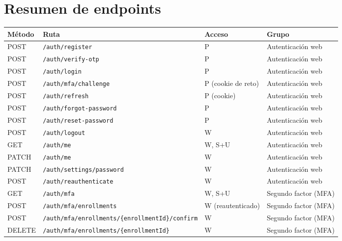 \documentclass[11pt,a4paper]{report}
\begin{document}
\section{Resumen de endpoints}
\begin{center}\small
\begin{longtable}{@{}lp{7.3cm}p{2.8cm}p{3.4cm}@{}}
\toprule
Método & Ruta & Acceso & Grupo \\
\midrule
\endhead
POST & \texttt{/\allowbreak{}auth/\allowbreak{}register} & P & Autenticación web\\
POST & \texttt{/\allowbreak{}auth/\allowbreak{}verify-otp} & P & Autenticación web\\
POST & \texttt{/\allowbreak{}auth/\allowbreak{}login} & P & Autenticación web\\
POST & \texttt{/\allowbreak{}auth/\allowbreak{}mfa/\allowbreak{}challenge} & P (cookie de reto) & Autenticación web\\
POST & \texttt{/\allowbreak{}auth/\allowbreak{}refresh} & P (cookie) & Autenticación web\\
POST & \texttt{/\allowbreak{}auth/\allowbreak{}forgot-password} & P & Autenticación web\\
POST & \texttt{/\allowbreak{}auth/\allowbreak{}reset-password} & P & Autenticación web\\
POST & \texttt{/\allowbreak{}auth/\allowbreak{}logout} & W & Autenticación web\\
GET & \texttt{/\allowbreak{}auth/\allowbreak{}me} & W, S+U & Autenticación web\\
PATCH & \texttt{/\allowbreak{}auth/\allowbreak{}me} & W & Autenticación web\\
PATCH & \texttt{/\allowbreak{}auth/\allowbreak{}settings/\allowbreak{}password} & W & Autenticación web\\
POST & \texttt{/\allowbreak{}auth/\allowbreak{}reauthenticate} & W & Autenticación web\\
GET & \texttt{/\allowbreak{}auth/\allowbreak{}mfa} & W, S+U & Segundo factor (MFA)\\
POST & \texttt{/\allowbreak{}auth/\allowbreak{}mfa/\allowbreak{}enrollments} & W (reautenticado) & Segundo factor (MFA)\\
POST & \texttt{/\allowbreak{}auth/\allowbreak{}mfa/\allowbreak{}enrollments/\allowbreak{}\{enrollmentId\}/\allowbreak{}confirm} & W & Segundo factor (MFA)\\
DELETE & \texttt{/\allowbreak{}auth/\allowbreak{}mfa/\allowbreak{}enrollments/\allowbreak{}\{enrollmentId\}} & W & Segundo factor (MFA)\\

\end{longtable}
\end{center}
\end{document}
